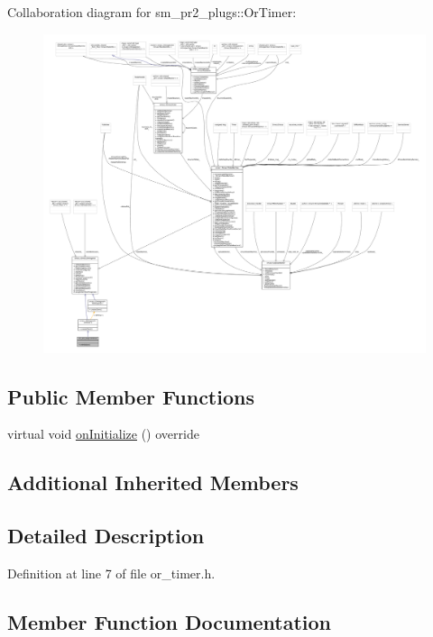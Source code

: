 Collaboration diagram for sm\+\_\+pr2\+\_\+plugs\+:\+:Or\+Timer\+:
\nopagebreak
\begin{figure}[H]
\begin{center}
\leavevmode
\includegraphics[width=350pt]{classsm__pr2__plugs_1_1OrTimer__coll__graph}
\end{center}
\end{figure}
\subsection*{Public Member Functions}
\begin{DoxyCompactItemize}
\item 
virtual void \hyperlink{classsm__pr2__plugs_1_1OrTimer_a261938a89cf08744103332ffb0ee2976}{on\+Initialize} () override
\end{DoxyCompactItemize}
\subsection*{Additional Inherited Members}


\subsection{Detailed Description}


Definition at line 7 of file or\+\_\+timer.\+h.



\subsection{Member Function Documentation}
